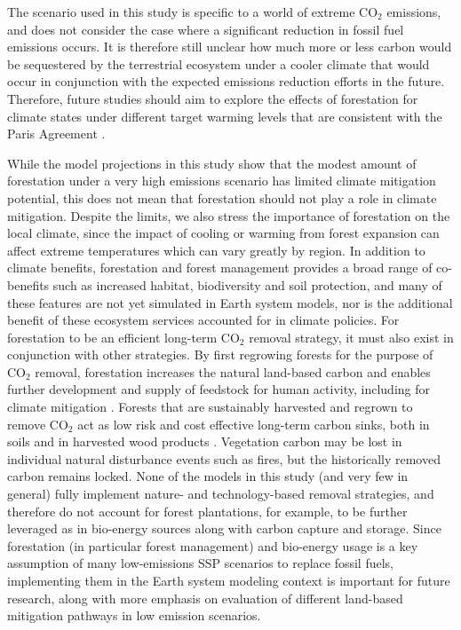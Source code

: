 \documentclass[draft]{agujournal2019}
\begin{document}
The scenario used in this study is specific to a world of extreme CO$_2$ emissions, and does not consider the case where a significant reduction in fossil fuel emissions occurs.
It is therefore still unclear how much more or less carbon would be sequestered by the terrestrial ecosystem under a cooler climate that would occur in conjunction with the expected emissions reduction efforts in the future.
Therefore, future studies should aim to explore the effects of forestation for climate states under different target warming levels that are consistent with the Paris Agreement \cite <for example>{king_studying_2021}.

While the model projections in this study show that the modest amount of forestation under a very high emissions scenario has limited climate mitigation potential, this does not mean that forestation should not play a role in climate mitigation.
Despite the limits, we also stress the importance of forestation on the local climate, since the impact of cooling or warming from forest expansion can affect extreme temperatures which can vary greatly by region.
In addition to climate benefits, forestation and forest management provides a broad range of co-benefits such as increased habitat, biodiversity and soil protection, and many of these features are not yet simulated in Earth system models, nor is the additional benefit of these ecosystem services accounted for in climate policies.
For forestation to be an efficient long-term CO$_2$ removal strategy, it must also exist in conjunction with other strategies.
By first regrowing forests for the purpose of CO$_2$ removal, forestation increases the natural land-based carbon and enables further development and supply of feedstock for human activity, including for climate mitigation \cite{geng_review_2017}.
Forests that are sustainably harvested and regrown to remove CO$_2$ act as low risk and cost effective long-term carbon sinks, both in soils and in harvested wood products \cite{schulze_climate_2020,soimakallio_trade-offs_2021}.
Vegetation carbon may be lost in individual natural disturbance events such as fires, but the historically removed carbon remains locked.
None of the models in this study (and very few in general) fully implement nature- and technology-based removal strategies, and therefore do not account for forest plantations, for example, to be further leveraged as in bio-energy sources along with carbon capture and storage.
Since forestation (in particular forest management) and bio-energy usage is a key assumption of many low-emissions SSP scenarios to replace fossil fuels, implementing them in the Earth system modeling context is important for future research, along with more emphasis on evaluation of different land-based mitigation pathways in low emission scenarios.
\end{document}
